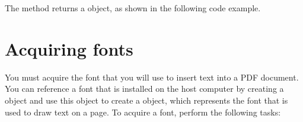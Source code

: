 \documentclass[letterpaper,12pt,english,openany,oneside]{sphinxmanual}
\begin{document}
The  method returns a  object, as shown in the following code example.

\begin{sphinxVerbatim}[commandchars=\\\{\}]
 
   
\end{sphinxVerbatim}


\section{Acquiring fonts}
\label{\detokenize{Plugins_Insertext:acquiring-fonts}}
You must acquire the font that you will use to insert text into a PDF document. You can reference a font that is installed on the host computer by creating a  object and use this object to create a  object, which represents the font that is used to draw text on a page. To acquire a font, perform the following tasks:
\end{document}
